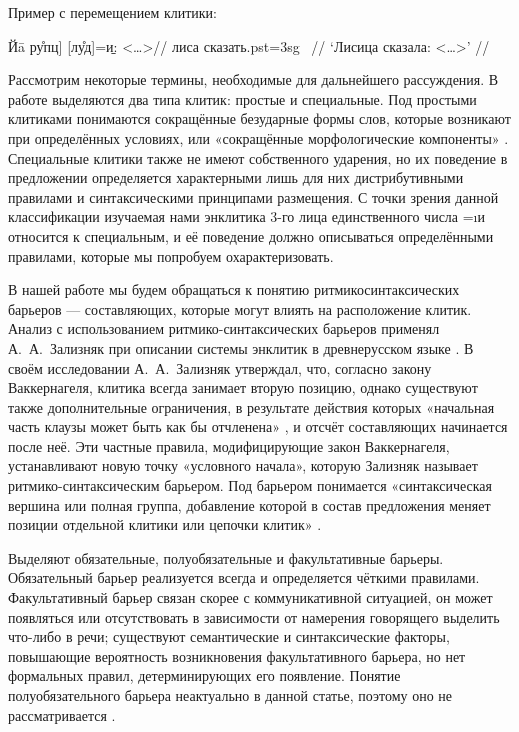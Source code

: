 Пример с перемещением клитики:

\begingl
\gla {[}Йā ру̊пц{]} {[}лу̊д{]}=\b{и}: <…>//
 лиса сказать.{\sc pst=3sg} ~//
\glft ‘Лисица сказала: <…>’ //
\endgl \xe

Рассмотрим некоторые термины, необходимые для дальнейшего рассуждения. В работе \parencite[6]{zwicky1977} выделяются два типа клитик: простые и специальные. Под простыми клитиками понимаются сокращённые безударные формы слов, которые возникают при определённых условиях, или «сокращённые морфологические компоненты» \parencite[132]{nikolaeva2008}. Специальные клитики также не имеют собственного ударения, но их поведение в предложении определяется характерными лишь для них дистрибутивными правилами и синтаксическими принципами размещения. С точки зрения данной классификации изучаемая нами энклитика 3-го лица единственного числа =\i{и} относится к специальным, и её поведение должно описываться определёнными правилами, которые мы попробуем охарактеризовать.

В нашей работе мы будем обращаться к понятию ритмикосинтаксических барьеров — составляющих, которые могут влиять на расположение клитик. Анализ с использованием ритмико-синтаксических барьеров применял А.~А.~Зализняк при описании системы энклитик в древнерусском языке \parencite{zalizniak2008}. В своём исследовании А.~А.~Зализняк утверждал, что, согласно закону Ваккернагеля, клитика всегда занимает вторую позицию, однако существуют также дополнительные ограничения, в результате действия которых «начальная часть клаузы может быть как бы отчленена» \parencite[48]{zalizniak2008}, и отсчёт составляющих начинается после неё. Эти частные правила, модифицирующие закон Ваккернагеля, устанавливают новую точку «условного начала», которую Зализняк называет ритмико-синтаксическим барьером. Под барьером понимается «синтаксическая вершина или полная группа, добавление которой в состав предложения меняет позиции отдельной клитики или цепочки клитик» \parencite[387]{zimmerling2013}.

Выделяют обязательные, полуобязательные и факультативные барьеры. Обязательный барьер реализуется всегда и определяется чёткими правилами. Факультативный барьер связан скорее с коммуникативной ситуацией, он может появляться или отсутствовать в зависимости от намерения говорящего выделить что-либо в речи; существуют семантические и синтаксические факторы, повышающие вероятность возникновения факультативного барьера, но нет формальных правил, детерминирующих его появление. Понятие полуобязательного барьера неактуально в данной статье, поэтому оно не рассматривается \parencite[54]{zalizniak2008}.

